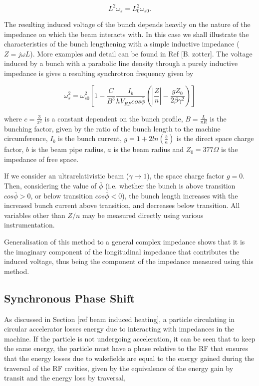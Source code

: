 \begin{equation}
L^{2}\omega_{s} = L_{0}^{2}\omega_{s0}.
\end{equation}

The resulting induced voltage of the bunch depends heavily on the nature of the impedance on which the beam interacts with. In this case we shall illustrate the characteristics of the bunch lengthening with a simple inductive impedance ($Z = j\omega L$). More examples and detail can be found in Ref [B. zotter]. The voltage induced by a bunch with a parabolic line density through a purely inductive impedance is gives a resulting synchrotron frequency given by

\begin{equation}
\omega_{s}^{2} = \omega_{s0}^{2}\left[ 1 - \frac{C}{B^{3}} \frac{I_{b}}{hV_{RF}cos\bar{\phi}} \left( \left| \frac{Z}{n}  \right| - \frac{gZ_{0}}{2\beta\gamma^{2}}   \right)    \right]
\end{equation}

where $c = \frac{3}{\pi^{2}}$ is a constant dependent on the bunch profile, $B = \frac{L}{\pi R}$ is the bunching
factor, given by the ratio of the bunch length to the machine circumference, $I_{b}$ is the bunch current, $g = 1 + 2ln\left(\frac{b}{a} \right)$ is the direct space charge factor, $b$ is the beam pipe radius, $a$ is the beam radius and $Z_{0} = 377\Omega$ is the impedance of free space.

If we consider an ultrarelativistic beam ($\gamma \rightarrow 1$), the space charge factor $g = 0$. Then, considering the value of $\bar{\phi}$ (i.e. whether the bunch is above transition $cos\bar{\phi} > 0$, or below transition $cos\bar{\phi} < 0$), the bunch length increases with the increased bunch current above transition, and decreases below transition. All variables other than $Z/n$ may be measured directly using various instrumentation.

Generalisation of this method to a general complex impedance shows that it is the imaginary component of the longitudinal impedance that contributes the induced voltage, thus being the component of the impedance measured using this method.

\subsection{Synchronous Phase Shift}
\label{sec:syn-phase-shift}

As discussed in Section [ref beam induced heating], a particle circulating in circular accelerator losses energy due to interacting with impedances in the machine. If the particle is not undergoing acceleration, it can be seen that to keep the same energy, the particle must have a phase relative to the RF that ensures that the energy losses due to wakefields are equal to the energy gained during the traversal of the RF cavities, given by the equivalence of the energy gain by transit and the energy loss by traversal,

